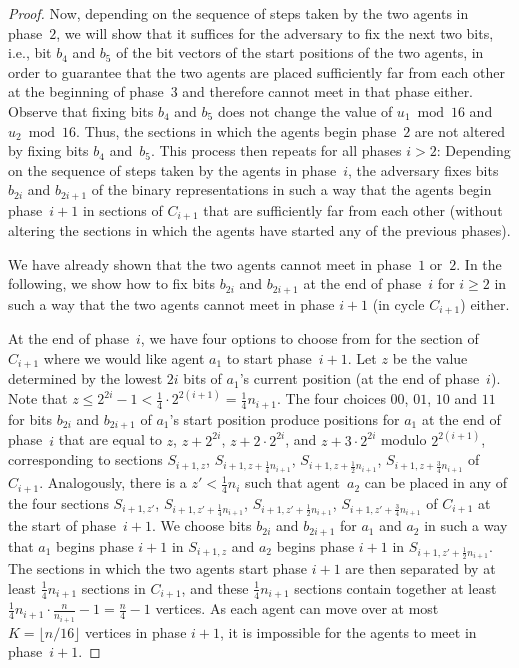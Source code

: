 {\begin{proof}
    Now, depending on the sequence of steps taken by the two agents in
    phase~$2$, we will show that it suffices for the adversary to fix the next
    two bits, i.e., bit $b_4$ and $b_5$ of the bit vectors of the start
    positions of the two agents, in order to guarantee that the two agents are
    placed sufficiently far from each other at the beginning of phase~$3$ and
    therefore cannot meet in that phase either. Observe that fixing bits $b_4$
    and $b_5$ does not change the value of $u_1\bmod 16$ and $u_2\bmod 16$.
    Thus, the sections in which the agents begin phase~$2$ are not altered by
    fixing bits $b_4$ and~$b_5$. This process then repeats for all phases $i>2$:
    Depending on the sequence of steps taken by the agents in phase~$i$, the
    adversary fixes bits $b_{2i}$ and $b_{2i+1}$ of the binary representations
    in such a way that the agents begin phase~$i+1$ in sections of $C_{i+1}$
    that are sufficiently far from each other (without altering the sections in
    which the agents have started any of the previous phases).

    We have already shown that the two agents cannot meet in phase~$1$ or~$2$.
    In the following, we show how to fix bits $b_{2i}$ and $b_{2i+1}$ at the end
    of phase~$i$ for $i\ge 2$ in such a way that the two agents cannot meet in
    phase $i+1$ (in cycle $C_{i+1}$) either.
	
   At the end of phase~$i$, we have four options to choose from for the section
   of $C_{i+1}$ where we would like agent $a_1$ to start phase~$i+1$. Let $z$ be
   the value determined by the lowest $2i$ bits of $a_1$'s current position (at
   the end of phase~$i$). Note that $z\le 2^{2i}-1<\frac14\cdot
   2^{2(i+1)}=\frac14 n_{i+1}$. The four choices $00$, $01$, $10$ and $11$ for
   bits $b_{2i}$ and $b_{2i+1}$ of $a_1$'s start position produce positions for
   $a_1$ at the end of phase~$i$ that are equal to $z$, $z+2^{2i}$, $z+2\cdot
   2^{2i}$, and $z+3\cdot 2^{2i}$ modulo $2^{2(i+1)}$, corresponding to sections
   $S_{i+1,z}$, $S_{i+1,z+\frac14 n_{i+1}}$, $S_{i+1,z+\frac12 n_{i+1}}$,
   $S_{i+1,z+\frac34 n_{i+1}}$ of $C_{i+1}$. Analogously, there is a $z'<\frac14
   n_i$ such that agent~$a_2$ can be placed in any of the four sections
   $S_{i+1,z'}$, $S_{i+1,z'+\frac14 n_{i+1}}$, $S_{i+1,z'+\frac12 n_{i+1}}$,
   $S_{i+1,z'+\frac34 n_{i+1}}$ of $C_{i+1}$ at the start of phase~$i+1$. We
   choose bits $b_{2i}$ and $b_{2i+1}$ for $a_1$ and $a_2$ in such a way that
   $a_1$ begins phase $i+1$ in $S_{i+1,z}$ and $a_2$ begins phase $i+1$ in
   $S_{i+1,z'+\frac12 n_{i+1}}$. The sections in which the two agents start
   phase $i+1$ are then separated by at least $\frac14 n_{i+1}$ sections in
   $C_{i+1}$, and these $\frac14 n_{i+1}$ sections contain together at least
   $\frac14 n_{i+1} \cdot \frac{n}{n_{i+1}} - 1 = \frac{n}{4}-1$ vertices. As
   each agent can move over at most $K=\lfloor n/16\rfloor$ vertices in phase
   $i+1$, it is impossible for the agents to meet in phase~$i+1$.


\end{proof}}
